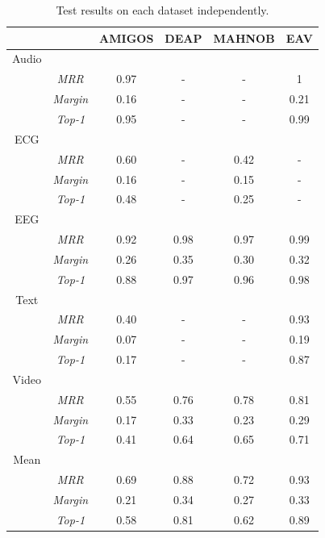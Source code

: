 \begin{table}
    \centering
    \begin{tabular}{c c | c | c | c | c}
        &                 & AMIGOS & DEAP & MAHNOB & EAV  \\ \hline
        Audio &                 &        &      &        &      \\
        & \textit{MRR}    & 0.97   & -    & -      & 1    \\
        & \textit{Margin} & 0.16   & -    & -      & 0.21 \\
        & \textit{Top-1}  & 0.95   & -    & -      & 0.99 \\ \hline
        ECG   &                 &        &      &        &      \\
        & \textit{MRR}    & 0.60   & -    & 0.42   & -    \\
        & \textit{Margin} & 0.16   & -    & 0.15   & -    \\
        & \textit{Top-1}  & 0.48   & -    & 0.25   & -    \\ \hline
        EEG   &                 &        &      &        &      \\
        & \textit{MRR}    & 0.92   & 0.98 & 0.97   & 0.99 \\
        & \textit{Margin} & 0.26   & 0.35 & 0.30   & 0.32 \\
        & \textit{Top-1}  & 0.88   & 0.97 & 0.96   & 0.98 \\ \hline
        Text  &                 &        &      &        &      \\
        & \textit{MRR}    & 0.40   & -    & -      & 0.93 \\
        & \textit{Margin} & 0.07   & -    & -      & 0.19 \\
        & \textit{Top-1}  & 0.17   & -    & -      & 0.87 \\ \hline
        Video &                 &        &      &        &      \\
        & \textit{MRR}    & 0.55   & 0.76 & 0.78   & 0.81 \\
        & \textit{Margin} & 0.17   & 0.33 & 0.23   & 0.29 \\
        & \textit{Top-1}  & 0.41   & 0.64 & 0.65   & 0.71 \\ \hline
        Mean  &                 &        &      &        &      \\
        & \textit{MRR}    & 0.69   & 0.88 & 0.72   & 0.93 \\
        & \textit{Margin} & 0.21   & 0.34 & 0.27   & 0.33 \\
        & \textit{Top-1}  & 0.58   & 0.81 & 0.62   & 0.89 \\ \hline
    \end{tabular}

    \caption{Test results on each dataset independently.}
    \label{tab:metrics-per-ds}
\end{table}



